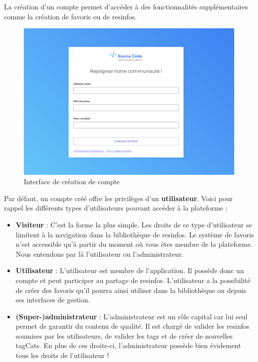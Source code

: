 La création d'un compte permet d'accéder à des fonctionnalités supplémentaires comme la création de favoris ou de \glspl{resinfo}.\\

\begin{figure}[H]
    \includegraphics[width=\textwidth,height=0.35\textheight,keepaspectratio]{images/client/register.png}
    \centering
    \caption[SourceCode : interface de création de compte]{Interface de création de compte}
\end{figure}

Par défaut, un compte créé offre les privilèges d'un \textbf{utilisateur}. Voici pour rappel les différents types d'utilisateurs pouvant accéder à la plateforme :

\begin{itemize}
    \item \textbf{Visiteur} : C'est la forme la plus simple. Les droits de ce type d'utilisateur se limitent à la navigation dans la bibliothèque de \glspl{resinfo}. Le système de favoris n'est accessible qu'à partir du moment où vous êtes membre de la plateforme. Nous entendons par là l'utilisateur ou l'administrateur.
    \item \textbf{Utilisateur} : L'utilisateur est membre de l'application. Il possède donc un compte et peut participer au partage de \glspl{resinfo}. L'utilisateur a la possibilité de créer des favoris qu'il pourra ainsi utiliser dans la bibliothèque ou depuis ses interfaces de gestion.
    \item \textbf{(Super-)administrateur} : L'administrateur est un rôle capital car lui seul permet de garantir du contenu de qualité. Il est chargé de valider les \glspl{resinfo} soumises par les utilisateurs, de valider les \glspl{tag} et de créer de nouvelles \glspl{tagCat}. En plus de ces droits-ci, l'administrateur possède bien évidement tous les droits de l'utilisateur !
\end{itemize}

